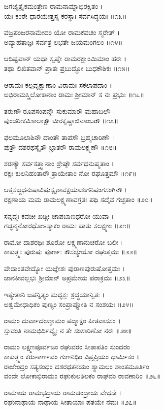 ಜಗಜೈತ್ರೈಕಮಂತ್ರೇಣ ರಾಮನಾಮ್ನಾಭಿರಕ್ಷಿತಂ ।\\
ಯಃ ಕಂಠೇ ಧಾರಯೇತ್ತಸ್ಯ ಕರಸ್ಥಾಃ ಸರ್ವಸಿದ್ಧಯಃ ॥೧೩॥

ವಜ್ರಪಂಜರನಾಮೇದಂ ಯೋ ರಾಮಕವಚಂ ಸ್ಮರೇತ್ ।\\
ಅವ್ಯಾಹತಾಜ್ಞಃ ಸರ್ವತ್ರ ಲಭತೇ ಜಯಮಂಗಲಂ ॥೧೪॥

ಆದಿಷ್ಟವಾನ್ ಯಥಾ ಸ್ವಪ್ನೇ ರಾಮರಕ್ಷಾಂಮಿಮಾಂ ಹರಃ ।\\
ತಥಾ ಲಿಖಿತವಾನ್ ಪ್ರಾತಃ ಪ್ರಬುದ್ಧೋ ಬುಧಕೌಶಿಕಃ ॥೧೫॥

ಆರಾಮಃ ಕಲ್ಪವೃಕ್ಷಾಣಾಂ ವಿರಾಮಃ ಸಕಲಾಪದಾಂ ।\\
ಅಭಿರಾಮಸ್ತ್ರಿಲೋಕಾನಾಂ ರಾಮಃ ಶ್ರೀಮಾನ್ ಸ ನಃ ಪ್ರಭುಃ ॥೧೬॥

ತರುಣೌ ರೂಪಸಂಪನ್ನೌ ಸುಕುಮಾರೌ ಮಹಾಬಲೌ ।\\
ಪುಂಡರೀಕವಿಶಾಲಾಕ್ಷೌ ಚೀರಕೃಷ್ಣಾಜಿನಾಂಬರೌ ॥೧೭॥

ಫಲಮೂಲಾಶಿನೌ ದಾಂತೌ ತಾಪಸೌ ಬ್ರಹ್ಮಚಾರಿಣೌ ।\\
ಪುತ್ರೌ ದಶರಥಸ್ಯೈತೌ ಭ್ರಾತರೌ ರಾಮಲಕ್ಷ್ಮಣೌ ॥೧೮॥

ಶರಣ್ಯೌ ಸರ್ವಸತ್ತ್ವಾನಾಂ ಶ್ರೇಷ್ಠೌ ಸರ್ವಧನುಷ್ಮತಾಂ ।\\
ರಕ್ಷಃ ಕುಲನಿಹಂತಾರೌ ತ್ರಾಯೇತಾಂ ನೋ ರಘೂತ್ತಮೌ ॥೧೯॥

ಆತ್ತಸಜ್ಜಧನುಷಾವಿಷುಸ್ಪೃಶಾವಕ್ಷಯಾಶುಗನಿಷಂಗಸಂಗಿನೌ ।\\
ರಕ್ಷಣಾಯ ಮಮ ರಾಮಲಕ್ಷ್ಮಣಾವಗ್ರತಃ ಪಥಿ ಸದೈವ ಗಚ್ಛತಾಂ ॥೨೦॥

ಸನ್ನದ್ಧಃ ಕವಚೀ ಖಡ್ಗೀ ಚಾಪಬಾಣಧರೋ ಯುವಾ ।\\
ಗಚ್ಛನ್ಮನೋರಥೋಽಸ್ಮಾಕಂ ರಾಮಃ ಪಾತು ಸಲಕ್ಷ್ಮಣಃ ॥೨೧॥

ರಾಮೋ ದಾಶರಥಿಃ ಶೂರೋ ಲಕ್ಷ್ಮಣಾನುಚರೋ ಬಲೀ ।\\
ಕಾಕುತ್ಸ್ಥಃ ಪುರುಷಃ ಪೂರ್ಣಃ ಕೌಸಲ್ಯೇಯೋ ರಘುತ್ತಮಃ ॥೨೨॥

ವೇದಾಂತವೇದ್ಯೋ ಯಜ್ಞೇಶಃ ಪುರಾಣಪುರುಷೋತ್ತಮಃ ।\\
ಜಾನಕೀವಲ್ಲಭಃ ಶ್ರೀಮಾನ್ ಅಪ್ರಮೇಯ ಪರಾಕ್ರಮಃ ॥೨೩॥

ಇತ್ಯೇತಾನಿ ಜಪನ್ನಿತ್ಯಂ ಮದ್ಭಕ್ತಃ ಶ್ರದ್ಧಯಾನ್ವಿತಃ ।\\
ಅಶ್ವಮೇಧಾಧಿಕಂ ಪುಣ್ಯಂ ಸಂಪ್ರಾಪ್ನೋತಿ ನ ಸಂಶಯಃ ॥೨೪॥

ರಾಮಂ ದುರ್ವಾದಲಶ್ಯಾಮಂ ಪದ್ಮಾಕ್ಷಂ ಪೀತವಾಸಸಂ ।\\
ಸ್ತುವಂತಿ ನಾಮಭಿರ್ದಿವ್ಯೈಃ ನ ತೇ ಸಂಸಾರಿಣೋ ನರಃ ॥೨೫॥

ರಾಮಂ ಲಕ್ಷ್ಮಣಪೂರ್ವಜಂ ರಘುವರಂ ಸೀತಾಪತಿಂ ಸುಂದರಂ \\
ಕಾಕುತ್ಸ್ಥಂ ಕರುಣಾರ್ಣವಂ ಗುಣನಿಧಿಂ ವಿಪ್ರಪ್ರಿಯಂ ಧಾರ್ಮಿಕಂ ।\\
ರಾಜೇಂದ್ರಂ ಸತ್ಯಸಂಧಂ ದಶರಥತನಯಂ ಶ್ಯಾಮಲಂ ಶಾಂತಮೂರ್ತಿಂ\\
ವಂದೇ ಲೋಕಾಭಿರಾಮಂ ರಘುಕುಲತಿಲಕಂ ರಾಘವಂ ರಾವಣಾರಿಂ ॥೨೬॥

ರಾಮಾಯ ರಾಮಭದ್ರಾಯ ರಾಮಚಂದ್ರಾಯ ವೇಧಸೇ ।\\
ರಘುನಾಥಾಯ ನಾಥಾಯ ಸೀತಾಯಾಃ ಪತಯೇ ನಮಃ ॥೨೭॥

